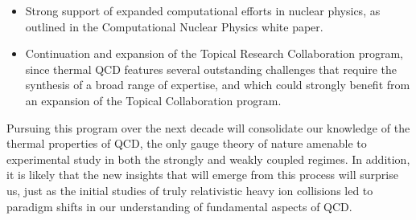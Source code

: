 \begin{enumerate}
\begin{itemize}
\item Strong support of expanded computational efforts in nuclear physics, as outlined in the Computational Nuclear Physics white paper. 

\item Continuation and expansion of the Topical Research Collaboration program, since 
thermal QCD features several outstanding challenges that require the synthesis of a broad range of expertise, and which could strongly benefit from an expansion of the Topical Collaboration program.
\end{itemize}
\end{enumerate}

Pursuing this program over the next decade will consolidate our knowledge of the thermal properties of QCD, the only gauge theory of nature amenable to experimental study in both the strongly and weakly coupled regimes. In addition, it is likely that the new insights that will emerge from this 
process will surprise us, just as the 
initial studies of truly relativistic heavy ion collisions 
led to paradigm shifts in our understanding 
of fundamental aspects of QCD.